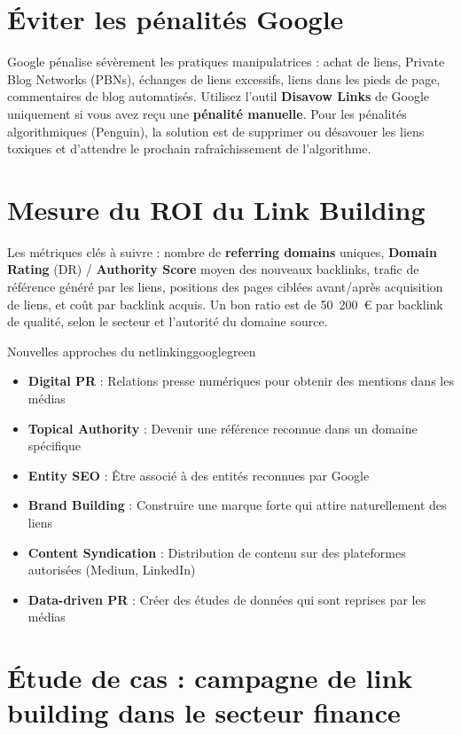\documentclass[12pt,a4paper,twoside]{report}
\newcommand{\keyword}[1]{\textbf{\textcolor{googleblue}{#1}}}
\begin{document}
\section{Éviter les pénalités Google}

Google pénalise sévèrement les pratiques manipulatrices : achat de liens, Private Blog Networks (PBNs), échanges de liens excessifs, liens dans les pieds de page, commentaires de blog automatisés. Utilisez l'outil \keyword{Disavow Links} de Google uniquement si vous avez reçu une \textbf{pénalité manuelle}. Pour les pénalités algorithmiques (Penguin), la solution est de supprimer ou désavouer les liens toxiques et d'attendre le prochain rafraîchissement de l'algorithme.

\section{Mesure du ROI du Link Building}

Les métriques clés à suivre : nombre de \keyword{referring domains} uniques, \keyword{Domain Rating} (DR) / \keyword{Authority Score} moyen des nouveaux backlinks, trafic de référence généré par les liens, positions des pages ciblées avant/après acquisition de liens, et coût par backlink acquis. Un bon ratio est de 50~200~€ par backlink de qualité, selon le secteur et l'autorité du domaine source.

\begin{mybox}{Nouvelles approches du netlinking}{googlegreen}
\begin{itemize}
    \item \textbf{Digital PR} : Relations presse numériques pour obtenir des mentions dans les médias
    \item \textbf{Topical Authority} : Devenir une référence reconnue dans un domaine spécifique
    \item \textbf{Entity SEO} : Être associé à des entités reconnues par Google
    \item \textbf{Brand Building} : Construire une marque forte qui attire naturellement des liens
    \item \textbf{Content Syndication} : Distribution de contenu sur des plateformes autorisées (Medium, LinkedIn)
    \item \textbf{Data-driven PR} : Créer des études de données qui sont reprises par les médias
\end{itemize}
\end{mybox}

\section{Étude de cas : campagne de link building dans le secteur finance}
\end{document}
